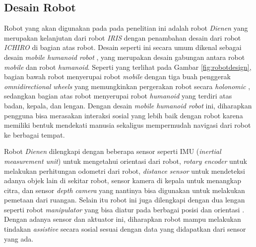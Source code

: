\subsection{Desain Robot}
\label{subsec:robotdesign}



Robot yang akan digunakan pada pada penelitian ini adalah robot \emph{Dienen} yang merupakan kelanjutan dari robot \emph{IRIS} \citep{dikairono2020}\citep{zanuar2019} dengan penambahan desain dari robot \emph{ICHIRO} \citep{muhtadin2019} di bagian atas robot.
Desain seperti ini secara umum dikenal sebagai desain \emph{mobile humanoid robot} \citep{mohamed2012},
  yang merupakan desain gabungan antara robot \emph{mobile} dan robot \emph{humanoid}.
Seperti yang terlihat pada Gambar \ref{fig:robotdesign},
  bagian bawah robot menyerupai robot \emph{mobile} dengan tiga buah penggerak \emph{omnidirectional wheels} yang memungkinkan pergerakan robot secara \emph{holonomic} \citep{oliveira2008},
  sedangkan bagian atas robot menyerupai robot \emph{humanoid} yang terdiri atas badan, kepala, dan lengan.
Dengan desain \emph{mobile humanoid robot} ini,
  diharapkan pengguna bisa merasakan interaksi sosial yang lebih baik dengan robot karena memiliki bentuk mendekati manusia \citep{rossi2018} sekaligus mempermudah navigasi dari robot ke berbagai tempat.

Robot \emph{Dienen} dilengkapi dengan beberapa sensor seperti IMU (\emph{inertial measurement unit}) untuk mengetahui orientasi dari robot,
  \emph{rotary encoder} untuk melakukan perhitungan odometri dari robot,
  \emph{distance sensor} untuk mendeteksi adanya objek lain di sekitar robot, sensor kamera di kepala untuk menangkap citra,
  dan sensor \emph{depth camera} yang nantinya bisa digunakan untuk melakukan pemetaan dari ruangan.
Selain itu robot ini juga dilengkapi dengan dua lengan seperti robot \emph{manipulator} yang bisa diatur pada berbagai posisi dan orientasi \citep{iqbal2012}.
Dengan adanya sensor dan aktuator ini,
  diharapkan robot mampu melakukan tindakan \emph{assistive} secara sosial sesuai dengan data yang didapatkan dari sensor yang ada.
